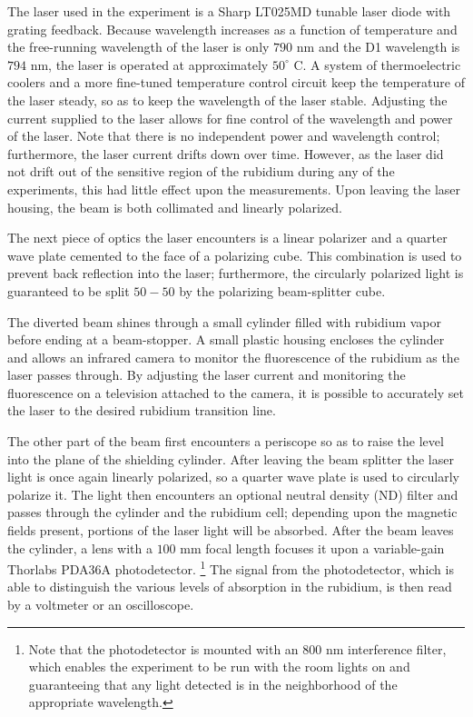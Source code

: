 The laser used in the experiment is a Sharp LT025MD tunable laser diode with grating feedback. Because wavelength increases as a function of temperature and the free-running wavelength of the laser is only $790$ nm and the D1 wavelength is $794$ nm, the laser is operated at approximately $50^{\circ}$ C. A system of thermoelectric coolers and a more fine-tuned temperature control circuit keep the temperature of the laser steady, so as to keep the wavelength of the laser stable.   Adjusting the current supplied to the laser allows for fine control of the wavelength and power of the laser. Note that there is no independent power and wavelength control; furthermore, the laser current drifts down over time. However, as the laser did not drift out of the sensitive region of the rubidium during any of the experiments, this had little effect upon the measurements. Upon leaving the laser housing, the beam is both collimated and linearly polarized.

The next piece of optics the laser encounters is a linear polarizer and a quarter wave plate cemented to the face of a polarizing cube. This combination is used to prevent back reflection into the laser; furthermore, the circularly polarized light is guaranteed to be split $50-50$ by the polarizing beam-splitter cube. 

The diverted beam shines through a small cylinder filled with rubidium vapor before ending at a beam-stopper. A small plastic housing encloses the cylinder and allows an infrared camera to monitor the fluorescence of the rubidium as the laser passes through. By adjusting the laser current and monitoring the fluorescence on a television attached to the camera, it is possible to accurately set the laser to the desired rubidium transition line.

The other part of the beam first encounters a periscope so as to raise the level into the plane of the shielding cylinder. After leaving the beam splitter the laser light is once again linearly polarized, so a quarter wave plate is used to circularly polarize it. The light then encounters an optional neutral density (ND) filter and passes through the cylinder and the rubidium cell; depending upon the magnetic fields present, portions of the laser light will be absorbed. After the beam leaves the cylinder, a lens with a $100$ mm focal length focuses it upon a variable-gain Thorlabs PDA36A photodetector. \footnote{Note that the photodetector is mounted with an $800$ nm interference filter, which enables the experiment to be run with the room lights on and guaranteeing that any light detected is in the neighborhood of the appropriate wavelength.} The signal from the photodetector, which is able to distinguish the various levels of absorption in the rubidium, is then read by a voltmeter or an oscilloscope.

